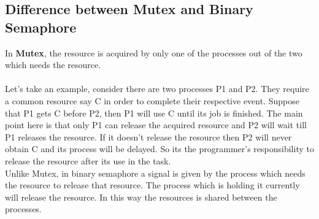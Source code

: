 \documentclass{article}
\begin{document}
\subsection{Difference between Mutex and Binary Semaphore}
In \textbf{Mutex}, the resource is acquired by only one of the processes out of the two which needs the resource.
\\
\\
Let's take an example, consider there are two processes  P1 and P2. They require a common resource say C in order to complete their respective event. Suppose that P1 gets C before P2, then P1 will use C until its job is finished. The main point here is that only P1 can release the acquired resource and P2 will wait till P1 releases the resource. If it doesn't release the resource then P2 will never obtain C and its process will be delayed. So its the programmer's responsibility to release the resource after its use in the task.\\
Unlike Mutex, in binary semaphore a signal is given by the process which needs the resource to release that resource. The process which is holding it currently will release the resource. In this way the resources is shared between the processes.
\end{document}
